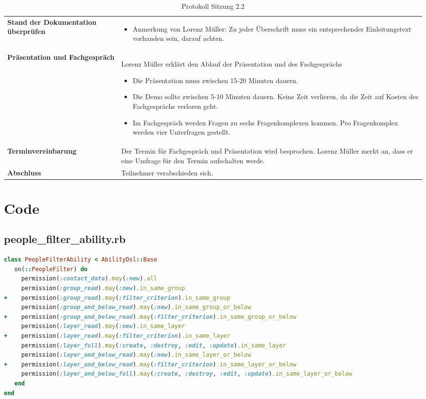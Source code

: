 \newpage

\begin{table}[H]
    \begin{tabular}{|L{0.3\textwidth}|L{0.7\textwidth}|}
        \hline
        \textbf{Stand der Dokumentation überprüfen} & 
        \begin{itemize}
            \item Anmerkung von Lorenz Müller: Zu jeder Überschrift muss ein entsprechender Einleitungstext vorhanden sein, darauf achten.
        \end{itemize} \\
        \textbf{Präsentation und Fachgespräch} & Lorenz Müller erklärt den Ablauf der Präsentation und des Fachgesprächs
        \begin{itemize}
            \item Die Präsentation muss zwischen 15-20 Minuten dauern.
            \item Die Demo sollte zwischen 5-10 Minuten dauern. Keine Zeit verlieren, da die Zeit auf Kosten des Fachgesprächs verloren geht.
            \item Im Fachgespräch werden Fragen zu sechs Fragenkomplexen kommen. Pro Fragenkomplex werden vier Unterfragen gestellt.
        \end{itemize}
        \\
        \hline
        \textbf{Terminvereinbarung} & Der Termin für Fachgespräch und Präsentation wird besprochen. Lorenz Müller merkt an, dass er eine Umfrage für den Termin aufschalten werde. \\
        \hline
        \textbf{Abschluss} & Teilnehmer verabschieden sich.   \\
        \hline
    \end{tabular}
    \caption{Protokoll Sitzung 2.2}
\end{table}

\section{Code}

\subsection{people\_filter\_ability.rb}
\begin{lstlisting}[language=Ruby]
class PeopleFilterAbility < AbilityDsl::Base
   on(::PeopleFilter) do
     permission(:contact_data).may(:new).all
     permission(:group_read).may(:new).in_same_group
+    permission(:group_read).may(:filter_criterion).in_same_group
     permission(:group_and_below_read).may(:new).in_same_group_or_below
+    permission(:group_and_below_read).may(:filter_criterion).in_same_group_or_below
     permission(:layer_read).may(:new).in_same_layer
+    permission(:layer_read).may(:filter_criterion).in_same_layer
     permission(:layer_full).may(:create, :destroy, :edit, :update).in_same_layer
     permission(:layer_and_below_read).may(:new).in_same_layer_or_below
+    permission(:layer_and_below_read).may(:filter_criterion).in_same_layer_or_below
     permission(:layer_and_below_full).may(:create, :destroy, :edit, :update).in_same_layer_or_below
   end
end
\end{lstlisting}

